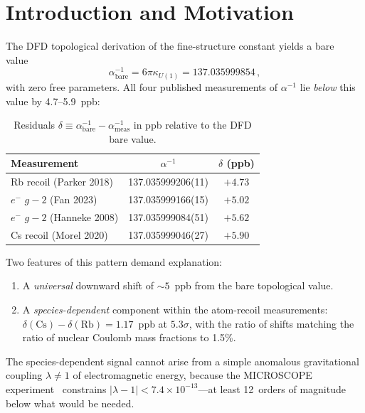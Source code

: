 \documentclass[aps,prd,twocolumn,superscriptaddress,nofootinbib]{revtex4-2}
\newcommand{\lam}{\lambda}
\newcommand{\ainv}{\alpha^{-1}}
\begin{document}
\section{Introduction and Motivation}
\label{sec:intro}

The DFD topological derivation of the fine-structure constant yields
a bare value~\cite{Alcock2026FSC}
\begin{equation}\label{eq:bare}
\ainv_{\mathrm{bare}} = 6\pi\kappa_{U(1)} = 137.035999854\,,
\end{equation}
with zero free parameters.  All four published measurements of $\ainv$
lie \emph{below} this value by 4.7--5.9~ppb:

\begin{table}[h]
\centering
\caption{Residuals $\delta \equiv \ainv_{\mathrm{bare}} - \ainv_{\mathrm{meas}}$
in ppb relative to the DFD bare value.}
\label{tab:residuals}
\renewcommand{\arraystretch}{1.2}
\begin{tabular}{lcc}
\toprule
\textbf{Measurement} & $\ainv$ & $\delta$ (ppb) \\
\midrule
Rb recoil (Parker 2018) & 137.035999206(11) & $+4.73$ \\
$e^-$ $g\!-\!2$ (Fan 2023) & 137.035999166(15) & $+5.02$ \\
$e^-$ $g\!-\!2$ (Hanneke 2008) & 137.035999084(51) & $+5.62$ \\
Cs recoil (Morel 2020) & 137.035999046(27) & $+5.90$ \\
\bottomrule
\end{tabular}
\end{table}

Two features of this pattern demand explanation:

\begin{enumerate}[nosep]
\item A \emph{universal} downward shift of $\sim\!5$~ppb from the
bare topological value.

\item A \emph{species-dependent} component within the atom-recoil
measurements: $\delta(\mathrm{Cs}) - \delta(\mathrm{Rb}) = 1.17$~ppb
at $5.3\sigma$, with the ratio of shifts matching the ratio of nuclear
Coulomb mass fractions to 1.5\%.
\end{enumerate}

The species-dependent signal cannot arise from a simple anomalous
gravitational coupling $\lam \neq 1$ of electromagnetic energy,
because the MICROSCOPE experiment~\cite{Touboul2022} constrains
$|\lam - 1| < 7.4 \times 10^{-13}$---at least 12~orders of magnitude
below what would be needed.
\end{document}
